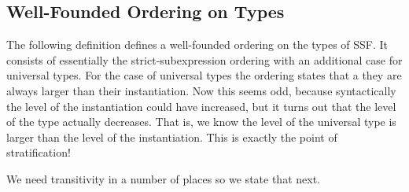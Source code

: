 \subsection{Well-Founded Ordering on Types}
\label{subsec:well-founded_ordering_on_types_ssf}
The following definition defines a well-founded ordering on the types
of SSF.  It consists of essentially the strict-subexpression ordering
with an additional case for universal types.  For the case of
universal types the ordering states that a they are always larger than
their instantiation.  Now this seems odd, because syntactically the
level of the instantiation could have increased, but it turns out that
the level of the type actually decreases.  That is, we know the level
of the universal type is larger than the level of the instantiation.
This is exactly the point of stratification!

\noindent
We need transitivity in a number of places so we state that next.

